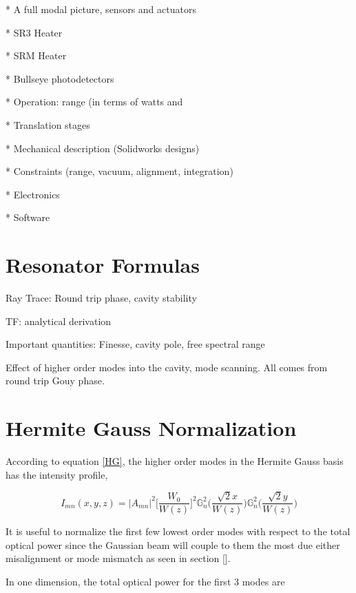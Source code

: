 \documentclass[oneside]{book}
\begin{document}
* A full modal picture, sensors and actuators

* SR3 Heater

* SRM Heater

* Bullseye photodetectors

* Operation: range (in terms of watts and %

* Translation stages

* Mechanical description (Solidworks designs)

* Constraints (range, vacuum, alignment, integration)

* Electronics 

* Software


	\listoffigures
	\listoftables

\begin{appendices}

	\chapter{Resonator Formulas}
	
	
	Ray Trace: Round trip phase, cavity stability
	
	TF: analytical derivation
	
	Important quantities: Finesse, cavity pole, free spectral range
	
	Effect of higher order modes into the cavity, mode scanning. All comes from round trip Gouy phase.
	
	
	\chapter{Hermite Gauss Normalization}
	According to equation \ref{HG}, the higher order modes in the Hermite Gauss basis has the intensity profile,
	
	\begin{equation}
		I_{mn} (x,y,z) = \vert A_{mn} \vert^2 \bigg[ \frac{W_0}{W(z)} \bigg]^2  \mathbb{G}^2_n\Bigg( \frac{\sqrt{2}x}{W(z)} \Bigg) \mathbb{G}^2_n\Bigg( \frac{\sqrt{2}y}{W(z)} \Bigg)
	\end{equation}

	It is useful to normalize the first few lowest order modes with respect to the total optical power since the Gaussian beam will couple to them the most due either misalignment or mode mismatch as seen in section [].
	
	In one dimension, the total optical power for the first 3 modes are
	

\end{appendices}
\end{document}
